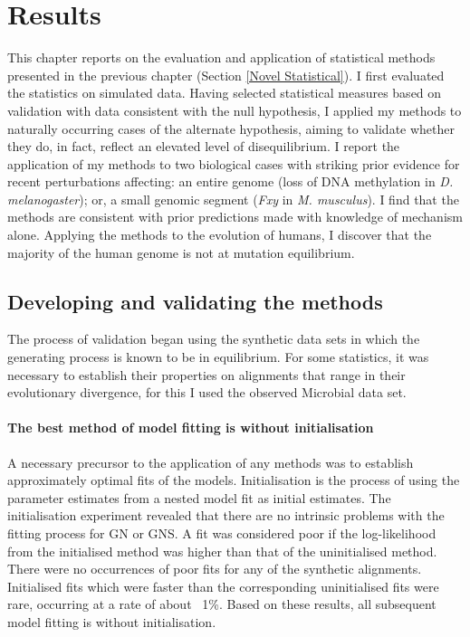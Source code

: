 \chapter{Results}

This chapter reports on the evaluation and application of statistical methods presented in the previous chapter (Section \ref{Novel Statistical}). I first evaluated the statistics on simulated data. Having selected statistical measures based on validation with data consistent with the null hypothesis, I applied my methods to naturally occurring cases of the alternate hypothesis, aiming to validate whether they do, in fact, reflect an elevated level of disequilibrium. I report the application of my methods to two biological cases with striking prior evidence for recent perturbations affecting: an entire genome (loss of DNA methylation in \textit{D. melanogaster}); or, a small genomic segment (\textit{Fxy} in \textit{M. musculus}). I find that the methods are consistent with prior predictions made with knowledge of mechanism alone. Applying the methods to the evolution of humans, I discover that the majority of the human genome is not at mutation equilibrium.

\section{Developing and validating the methods}
\label{Simulation}

The process of validation began using the synthetic data sets in which the generating process is known to be in equilibrium. For some statistics, it was necessary to establish their properties on alignments that range in their evolutionary divergence, for this I used the observed Microbial data set.  

\subsubsection{The best method of model fitting is without initialisation}

A necessary precursor to the application of any methods was to establish approximately optimal fits of the models. Initialisation is the process of using the parameter estimates from a nested model fit  as initial estimates. The initialisation experiment revealed that there are no intrinsic problems with the fitting process for GN or GNS. A fit was considered poor if the log-likelihood from the initialised method was higher than that of the uninitialised method. There were no occurrences of poor fits for any of the synthetic alignments. Initialised fits which were faster than the corresponding uninitialised fits were rare, occurring at a rate of about ~1\%. Based on these results, all subsequent model fitting is without initialisation.

